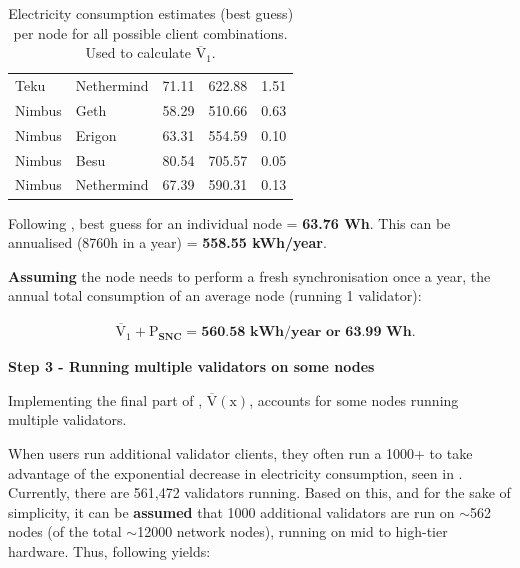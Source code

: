 \begin{table}[htb!]
\begin{tabular}{|ll|l|l|l|}
\multicolumn{1}{|l|}{Teku}               & Nethermind         & 71.11 & 622.88 & 1.51  \\ \cline{1-2}
\multicolumn{1}{|l|}{Nimbus}             & Geth               & 58.29 & 510.66 & 0.63  \\ \cline{1-2}
\multicolumn{1}{|l|}{Nimbus}             & Erigon             & 63.31 & 554.59 & 0.10  \\ \cline{1-2}
\multicolumn{1}{|l|}{Nimbus}             & Besu               & 80.54 & 705.57 & 0.05  \\ \cline{1-2}
\multicolumn{1}{|l|}{Nimbus}             & Nethermind         & 67.39 & 590.31 & 0.13  \\ \hline
\end{tabular}
\caption{Electricity consumption estimates (best guess) per node for all possible client combinations. Used to calculate $\boldsymbol{\mathrm{\overline{V}_{1}}}$.  }
\label{Table:EstimatesPerNode}
\end{table}

Following , best guess for an individual node =  \textbf{63.76 Wh}. This can be annualised (8760h in a year) = \textbf{558.55 kWh/year}.

\textbf{Assuming} the node needs to perform a fresh synchronisation once a year, the annual total consumption of an average node (running 1 validator):

\begin{align}
    &\boldsymbol{ \mathrm{\overline{V}_{1}} + \mathrm{P}_{SNC} = \text{560.58 kWh/year or 63.99 Wh.}} \nonumber
\end{align} 

\textbf{ Step 3 - Running multiple validators on some nodes}

Implementing the final part of , $\boldsymbol{\mathrm{\overline{V}(\mathrm{x})}}$, accounts for some nodes running multiple validators. 

When users run additional validator clients, they often run a 1000+ to take advantage of the exponential decrease in electricity consumption, seen in . Currently, there are 561,472 validators running. Based on this, and for the sake of simplicity, it can be \textbf{assumed} that 1000 additional validators are run on $\sim$562 nodes (of the total $\sim$12000 network nodes), running on mid to high-tier hardware. Thus, following  yields:

